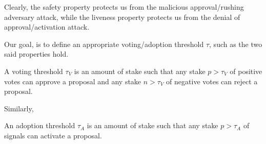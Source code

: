 Clearly, the safety property protects us from the malicious approval/rushing 
adversary attack, 
while the liveness property protects us from the denial of approval/activation 
attack.

Our goal, is to define an appropriate voting/adoption threshold $\tau$, such 
as the two said properties hold. 
\begin{definition}
	A voting threshold $\tau_V$ is an amount of 
	stake such that any stake $p 
	> \tau_V$ of positive votes can approve a proposal and any stake $n > 
	\tau_V$ of 	negative votes can reject a proposal.
\end{definition}
Similarly,
\begin{definition}
	An adoption threshold $\tau_A$ is 
	an amount of stake such that any stake $p 
	> \tau_A$ of signals can activate a proposal.
\end{definition}

%
%
%

